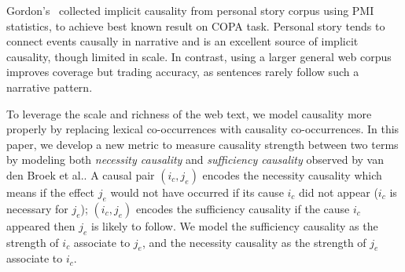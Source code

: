 Gordon's~ collected implicit causality from
personal story corpus using PMI statistics, to achieve
 best known result on COPA task.
Personal story tends to connect events causally in narrative and is 
an excellent source of implicit causality, though limited in scale.
In contrast, using a larger general web corpus improves coverage but 
trading accuracy, as sentences rarely follow such a narrative pattern.

To leverage the scale and richness of the web text,
we model causality more properly by replacing lexical co-occurrences with
causality co-occurrences. 
In this paper, we develop a new metric to measure causality strength between
two terms by modeling both \emph{necessity causality}
and \emph{sufficiency causality} observed by van den 
Broek et al..
A causal pair $(i_c,j_e)$ encodes the necessity causality which means
if the effect $j_e$ would not have occurred if its cause $i_c$ did not appear
($i_c$ is necessary for $j_e$);
$(i_c,j_e)$ encodes the sufficiency causality if the cause $i_c$ appeared then 
$j_e$ is likely to follow.
We model the sufficiency causality as the strength of $i_c$ associate to $j_e$,
and the necessity causality as the strength of $j_e$ associate to $i_c$.

